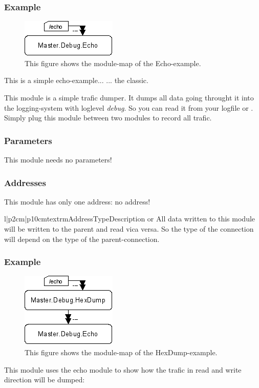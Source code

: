 \subsubsection{Example}
\begin{figure}[ht]
    \label{coremod06}
    \centering
    \includegraphics{coremod06.png}
    \caption{This figure shows the module-map of the Echo-example.}
\end{figure}    
This is a simple echo-example... ... the classic.





%
%
This module is a simple trafic dumper. It dumps all data going throught it
into the logging-system with loglevel \emph{debug}. So you can read it from
your logfile or . Simply plug this module between two modules
to record all trafic.

\subsubsection{Parameters}
This module needs no parameters!

\subsubsection{Addresses}
This module has only one address: no address! 
\begin{tableiii}{l|p{2cm}|p{10cm}}{textrm}{Address}{Type}{Description}
\lineiii{---}
        { or }
        {All data written to this module will be written to the parent and 
         read vica versa. So the type of the connection will depend on the
         type of the parent-connection.}
\end{tableiii}

\subsubsection{Example}
\begin{figure}[ht]
    \label{fig:coremod05.py}
    \centering
    \includegraphics{coremod05.png}
    \caption{This figure shows the module-map of the HexDump-example.}
\end{figure}    
This module uses the echo module to show how the trafic in read and write 
direction will be dumped:




